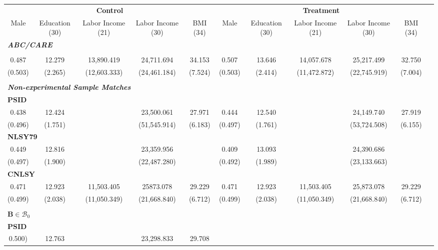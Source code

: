 \begin{tabular}{ccccccccccc} \toprule
\multicolumn{5}{c}{\textbf{Control}} & \multicolumn{5}{c}{\textbf{Treatment}} \\
Male  & Education (30)  & Labor Income (21)  & Labor Income (30)   & BMI (34) & Male  & Education (30)  & Labor Income (21)  & Labor Income (30)   & BMI (34) \\ \midrule
\multicolumn{10}{l}{\textit{\textbf{ABC/CARE}}} \\ \\
    0.487 &    12.279 & 13,890.419 & 24,711.694 &    34.153 &     0.507 &    13.646 & 14,057.678 & 25,217.499 &    32.750 \\  
    (0.503) &     (2.265) & (12,603.333) & (24,461.184) &     (7.524) &    (0.503) &     (2.414) & (11,472.872) & (22,745.919) &     (7.004) \\  \\ 
\multicolumn{10}{l}{\textit{\textbf{Non-experimental Sample Matches}}} \\
\multicolumn{10}{l}{\textbf{PSID}} \\
    0.438 &    12.424 &     & 23,500.061 &    27.971 &     0.444 &  	12.540   &    & 24,149.740 &    27.919 \\  
    (0.496) &     (1.751) &      & (51,545.914) &     (6.183) &     (0.497) &   (1.761)   &      & (53,724.508) &     (6.155) \\  
\multicolumn{10}{l}{\textbf{NLSY79}} \\    
    0.449 &    12.816 &   & 23,359.956 &  &     0.409 &    13.093 &   & 24,390.686 &  \\  
    (0.497) &     (1.900) &   & (22,487.280) &  &     (0.492) &     (1.989) &   & (23,133.663) &  \\  
\multicolumn{10}{l}{\textbf{CNLSY}} \\
    0.471 &    12.923 & 11,503.405 & 25873.078 &    29.229 &     0.471 &    12.923 & 11,503.405 & 25,873.078 &    29.229 \\  
    (0.499) &     (2.038) & (11,050.349) & (21,668.840) &     (6.712) &     (0.499) &     (2.038) & (11,050.349) & (21,668.840) &     (6.712) \\  \\
\multicolumn{10}{l}{$\bm{B} \in \mathcal{B}_0$} \\
\multicolumn{10}{l}{\textbf{PSID}} \\
    0.500) &    12.763 &     & 23,298.833 &    29.708 &         &         &         &         &         \\  

\end{tabular}
